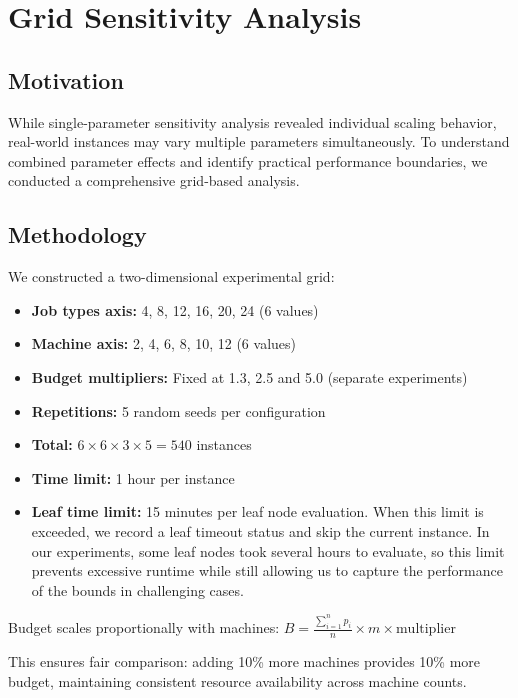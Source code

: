 \section{Grid Sensitivity Analysis}

\subsection{Motivation}

While single-parameter sensitivity analysis revealed individual scaling behavior, real-world instances may vary multiple parameters simultaneously. To understand combined parameter effects and identify practical performance boundaries, we conducted a comprehensive grid-based analysis.

\subsection{Methodology}

We constructed a two-dimensional experimental grid:
\begin{itemize}
    \item \textbf{Job types axis:} 4, 8, 12, 16, 20, 24 (6 values)
    \item \textbf{Machine axis:} 2, 4, 6, 8, 10, 12 (6 values)
    \item \textbf{Budget multipliers:} Fixed at 1.3, 2.5 and 5.0 (separate experiments)
    \item \textbf{Repetitions:} 5 random seeds per configuration
    \item \textbf{Total:} $6 \times 6 \times 3 \times 5 = 540$ instances
    \item \textbf{Time limit:} 1 hour per instance
    \item \textbf{Leaf time limit:} 15 minutes per leaf node evaluation. When this limit is exceeded, we record a leaf timeout status and skip the current instance. In our experiments, some leaf nodes took several hours to evaluate, so this limit prevents excessive runtime while still allowing us to capture the performance of the bounds in challenging cases.
\end{itemize}

Budget scales proportionally with machines: $B = \frac{\sum_{i=1}^{n} p_i}{n} \times m \times \text{multiplier}$

This ensures fair comparison: adding 10\% more machines provides 10\% more budget, 
maintaining consistent resource availability across machine counts.







